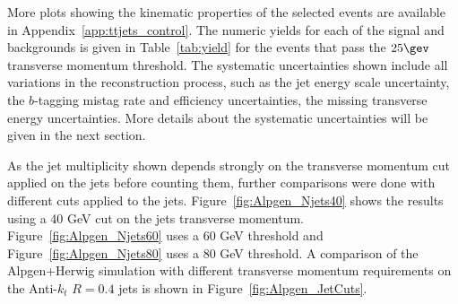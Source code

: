 \begin{sidewaysfigure}[tpbp]
\centering
{}
\caption{Jet multiplicity in the electron (left) and muon (right) channels using Alpgen simulation for the $t\bar{t}$ signal ($p_T > 25$ GeV).}
\label{fig:Alpgen_Njets}
\end{sidewaysfigure}

More plots showing the kinematic properties of the selected events are available in Appendix~\ref{app:ttjets_control}.
The numeric yields for each of the signal and backgrounds is given in Table~\ref{tab:yield} for the events that pass the $25\gev$ transverse momentum threshold.
The systematic uncertainties shown include all variations in the reconstruction process, such as
the jet energy scale uncertainty, the $b$-tagging mistag rate and efficiency uncertainties, the
missing transverse energy uncertainties.
More details about the systematic uncertainties will be given in the next section.




As the jet multiplicity shown depends strongly on the transverse momentum cut applied on the jets before counting them, further
comparisons were done with different cuts applied to the jets. Figure~\ref{fig:Alpgen_Njets40} shows
the results using a 40 GeV cut on the jets transverse momentum. Figure~\ref{fig:Alpgen_Njets60} uses a
60 GeV threshold and Figure~\ref{fig:Alpgen_Njets80} uses a 80 GeV threshold.
A comparison of the Alpgen+Herwig \ttbar simulation with different transverse momentum
requirements on the Anti-$k_t$ $R=0.4$ jets is shown in Figure~\ref{fig:Alpgen_JetCuts}.


\begin{sidewaysfigure}[tpbp]
\centering
{}
\caption{Jet multiplicity in the electron (left) and muon (right) channels using Alpgen simulation for the $t\bar{t}$ signal ($p_T > 40$ GeV).}
\label{fig:Alpgen_Njets40}
\end{sidewaysfigure}

